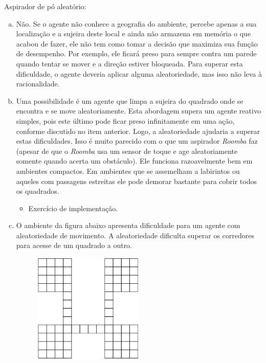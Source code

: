\begin{solution}
Aspirador de pó aleatório:
\begin{enumerate}[a.]
	\item Não. Se o agente não conhece a geografia do ambiente, percebe apenas a sua localização e a sujeira deste local e ainda não armazena em memória o que acabou de fazer, ele não tem como tomar a decisão que maximiza sua função de desempenho. Por exemplo, ele ficará preso para sempre contra um parede quando tentar se mover e a direção estiver bloqueada. Para superar esta dificuldade, o agente deveria aplicar alguma aleatoriedade, mas isso não leva à racionalidade.
	
	\item Uma possibilidade é um agente que limpa a sujeira do quadrado onde se encontra e se move aleatoriamente. Esta abordagem supera um agente reativo simples, pois este último pode ficar preso infinitamente em uma ação, conforme discutido no item anterior. Logo, a aleatoriedade ajudaria a superar estas dificuldades. Isso é muito parecido com o que um aspirador \textit{Roomba} faz (apesar de que o \textit{Roomba} usa um sensor de toque e age aleatoriamente somente quando acerta um obstáculo). Ele funciona razoavelmente bem em ambientes compactos. Em ambientes que se assemelham a labirintos ou aqueles com passagens estreitas ele pode demorar bastante para cobrir todos os quadrados.
	\begin{itemize}
		\item Exercício de implementação.
	\end{itemize}
	
	\item O ambiente da figura abaixo apresenta dificuldade para um agente com aleatoriedade de movimento. A aleatoriedade dificulta superar os corredores para acesse de um quadrado a outro.
	
	\begin{figure}[h]
		\centering
		\includegraphics[width=0.5\textwidth]{img/exercicios/ambiente-dificil-aleatoriedade}
	\end{figure}
	

\end{enumerate}
\end{solution}
